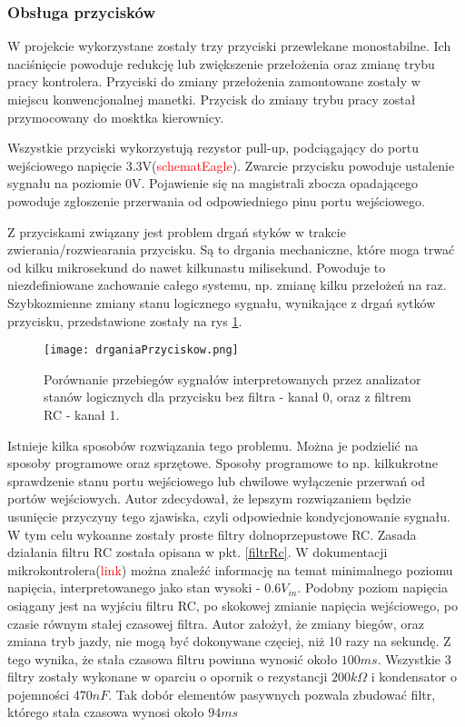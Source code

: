 \subsubsection{Obsługa przycisków}
W projekcie wykorzystane zostały trzy przyciski przewlekane monostabilne. Ich naciśnięcie powoduje redukcję lub zwiększenie przełożenia oraz zmianę trybu pracy kontrolera. Przyciski do zmiany przełożenia zamontowane zostały w miejscu konwencjonalnej manetki. Przycisk do zmiany trybu pracy został przymocowany do mosktka kierownicy.

Wszystkie przyciski wykorzystują rezystor pull-up, podciągający do portu wejściowego napięcie 3.3V(\textcolor{red}{schematEagle}). Zwarcie przycisku powoduje ustalenie sygnału na poziomie 0V. Pojawienie się na magistrali zbocza opadającego powoduje zgłoszenie przerwania od odpowiedniego pinu portu wejściowego. 

Z przyciskami związany jest problem drgań styków w trakcie zwierania/rozwiearania przycisku. Są to drgania mechaniczne, które moga trwać od kilku mikrosekund do nawet kilkunastu milisekund. Powoduje to niezdefiniowane zachowanie całego systemu, np. zmianę kilku przełożeń na raz. Szybkozmienne zmiany stanu logicznego sygnału, wynikające z drgań sytków przycisku, przedstawione zostały na rys \ref{fig:drganiaPrzyciskow}.
\begin{figure}[h]
    \centering
    \texttt{[image: drganiaPrzyciskow.png]}
    \caption{Porównanie przebiegów sygnałów interpretowanych przez analizator stanów logicznych dla przycisku bez filtra - kanał 0, oraz z filtrem RC - kanał 1.}
    \label{fig:drganiaPrzyciskow}
\end{figure}
Istnieje kilka sposobów rozwiązania tego problemu. Można je podzielić na sposoby programowe oraz sprzętowe. Sposoby programowe to np. kilkukrotne sprawdzenie stanu portu wejściowego lub chwilowe wyłączenie przerwań od portów wejściowych. Autor zdecydował, że lepszym rozwiązaniem będzie usunięcie przyczyny tego zjawiska, czyli odpowiednie kondycjonowanie sygnału. W tym celu wykoanne zostały proste filtry dolnoprzepustowe RC. Zasada działania filtru RC została opisana w pkt. \ref{filtrRc}. W dokumentacji mikrokontrolera(\textcolor{red}{link}) można znaleźć informację na temat minimalnego poziomu napięcia, interpretowanego jako stan wysoki - $0.6V_{in}$. Podobny poziom napięcia osiągany jest na wyjściu filtru RC, po skokowej zmianie napięcia wejściowego, po czasie równym stałej czasowej filtra. Autor założył, że zmiany biegów, oraz zmiana tryb jazdy, nie mogą być dokonywane częciej, niż 10 razy na sekundę. Z tego wynika, że stała czasowa filtru powinna wynosić około $100ms$. Wszystkie 3 filtry zostały wykonane w oparciu o opornik o rezystancji $200k\Omega$ i kondensator o pojemności 470$nF$. Tak dobór elementów pasywnych pozwala zbudować filtr, którego stała czasowa wynosi około $94ms$ 

